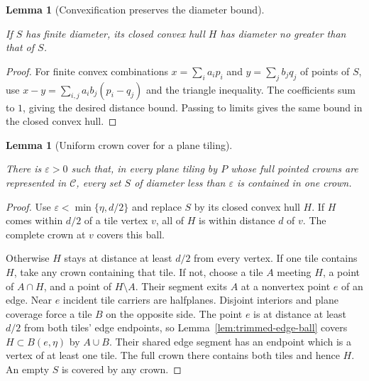 \documentclass[11pt,a4paper]{article}
\newtheorem{lemma}[definition]{Lemma}
\theoremstyle{remark}
\newcommand{\lean}[1]{}
\newcommand{\uses}[1]{}
\begin{document}
\begin{lemma}[Convexification preserves the diameter bound]
\label{lem:crown-convexification}
\lean{Tilings.Crowns.closedConvexHullDiameter}
\uses{def:polygon}
If $S$ has finite diameter, its closed convex hull $H$ has diameter no
greater than that of $S$.
\end{lemma}
\begin{proof}
For finite convex combinations $x=\sum_i a_i p_i$ and
$y=\sum_j b_j q_j$ of points of $S$, use
$x-y=\sum_{i,j}a_i b_j(p_i-q_j)$ and the triangle inequality.
The coefficients sum to $1$, giving the desired distance bound.
Passing to limits gives the same bound in the closed convex hull.
\end{proof}

\begin{lemma}[Uniform crown cover for a plane tiling]
\label{lem:crown-cover-plane}
\lean{Tilings.Crowns.uniformCrownCoverPlane}
\uses{def:tiling,def:crown-sector,lem:localfinite,lem:sector-radius,lem:trimmed-edge-ball,lem:crown-convexification}
There is $\varepsilon>0$ such that, in every plane tiling by $P$ whose
full pointed crowns are represented in $\mathcal C$, every set $S$ of
diameter less than $\varepsilon$ is contained in one crown.
\end{lemma}
\begin{proof}
Use $\varepsilon<\min\{\eta,d/2\}$ and replace $S$ by its closed convex
hull $H$.  If $H$ comes within $d/2$ of a tile vertex $v$, all of $H$ is
within distance $d$ of $v$.  The complete crown at $v$ covers this ball.

Otherwise $H$ stays at distance at least $d/2$ from every vertex.  If one
tile contains $H$, take any crown containing that tile.  If not, choose
a tile $A$ meeting $H$, a point of $A\cap H$, and a point of $H\setminus A$.
Their segment exits $A$ at a nonvertex point $e$ of an edge.  Near $e$
incident tile carriers are halfplanes.  Disjoint interiors and plane
coverage force a tile $B$ on the opposite side.  The point $e$ is at
distance at least $d/2$ from both tiles' edge endpoints, so
Lemma~\ref{lem:trimmed-edge-ball} covers $H\subset B(e,\eta)$ by $A\cup B$.
Their shared edge segment has an endpoint which is a vertex of at least
one tile.  The full crown there contains both tiles and hence $H$.
An empty $S$ is covered by any crown.
\end{proof}
\end{document}
